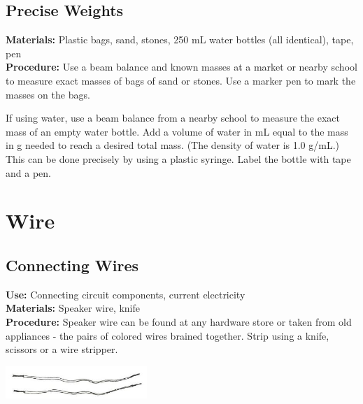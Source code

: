 \begin{multicols}{2}
\subsection{Precise Weights}
\vspace{-6pt}
\textbf{Materials:} Plastic bags, sand, stones, 250 mL water bottles (all identical), tape, pen\\
\textbf{Procedure:} 
Use a beam balance and known masses at a market or nearby school to measure exact masses of bags of sand or stones.  Use a marker pen to mark the masses on the bags. 

If using water, use a beam balance from a nearby school to measure the exact mass of an empty water bottle. Add a volume of water in mL equal to the mass in g needed to reach a desired total mass. (The density of water is 1.0 g/mL.) This can be done precisely by using a plastic syringe. Label the bottle with tape and a pen.


\section{Wire}
\label{sec:wire}

\subsection{Connecting Wires}
\vspace{-6pt}
\textbf{Use:} Connecting circuit components, current electricity\\
\textbf{Materials:} Speaker wire, knife\\
\textbf{Procedure:} Speaker wire can be found at any hardware store or taken from old appliances - the pairs of colored wires brained together. Strip using a knife, scissors or a wire stripper.
\begin{center}
\includegraphics[width=0.4\textwidth]{./img/source/wire.jpg}
\end{center}


\end{multicols}
